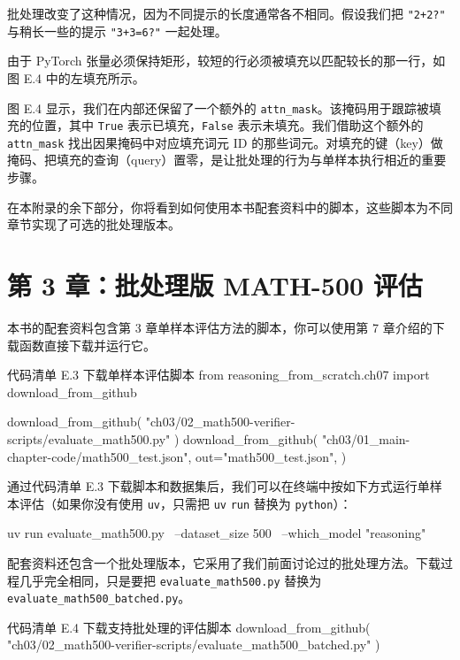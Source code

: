 批处理改变了这种情况，因为不同提示的长度通常各不相同。假设我们把 \texttt{"}\texttt{2+2?}\texttt{"} 与稍长一些的提示 \texttt{"}\texttt{3+3=6?}\texttt{"} 一起处理。

由于 PyTorch 张量必须保持矩形，较短的行必须被填充以匹配较长的那一行，如图 E.4 中的左填充所示。


图 E.4 显示，我们在内部还保留了一个额外的 \texttt{attn\_mask}。该掩码用于跟踪被填充的位置，其中 \texttt{True} 表示已填充，\texttt{False} 表示未填充。我们借助这个额外的 \texttt{attn\_mask} 找出因果掩码中对应填充词元 ID 的那些词元。对填充的键（key）做掩码、把填充的查询（query）置零，是让批处理的行为与单样本执行相近的重要步骤。

在本附录的余下部分，你将看到如何使用本书配套资料中的脚本，这些脚本为不同章节实现了可选的批处理版本。

\section{第 3 章：批处理版 MATH-500 评估}

本书的配套资料包含第 3 章单样本评估方法的脚本，你可以使用第 7 章介绍的下载函数直接下载并运行它。

\begin{codeboxt}{代码清单 E.3 下载单样本评估脚本}
from reasoning_from_scratch.ch07 import download_from_github

download_from_github(
    "ch03/02_math500-verifier-scripts/evaluate_math500.py"
)
download_from_github(
    "ch03/01_main-chapter-code/math500_test.json",
    out="math500_test.json",
)
\end{codeboxt}

通过代码清单 E.3 下载脚本和数据集后，我们可以在终端中按如下方式运行单样本评估（如果你没有使用 \texttt{uv}，只需把 \texttt{uv} \texttt{run} 替换为 \texttt{python}）：

\begin{codebox}
uv run evaluate_math500.py \
  --dataset_size 500 \
  --which_model "reasoning"
\end{codebox}

配套资料还包含一个批处理版本，它采用了我们前面讨论过的批处理方法。下载过程几乎完全相同，只是要把 \texttt{evaluate\_math500.py} 替换为 \texttt{evaluate\_math500\_batched.py}。

\begin{codeboxt}{代码清单 E.4 下载支持批处理的评估脚本}
download_from_github(
    "ch03/02_math500-verifier-scripts/evaluate_math500_batched.py"
)
\end{codeboxt}

